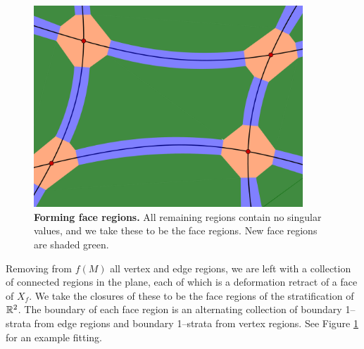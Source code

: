 \begin{figure}[h!]
	\centering
	\includegraphics[width=0.9\textwidth]{figures/face-sleeve.png}
	\caption{
		\textbf{Forming face regions.}
		All remaining regions contain no singular values, and we take these to be the face regions.
		New face regions are shaded green.
	}
	\label{fig:face-sleeve}
\end{figure}

Removing from $f(M)$ all vertex and edge regions, we are left with a collection of connected regions in the plane, each of which is a deformation retract of a face of $X_f$.
We take the closures of these to be the face regions of the stratification of $\mathbb{R}^2$.
The boundary of each face region is an alternating collection of boundary 1--strata from edge regions and boundary 1--strata from vertex regions.
See Figure \ref{fig:face-sleeve} for an example fitting.

